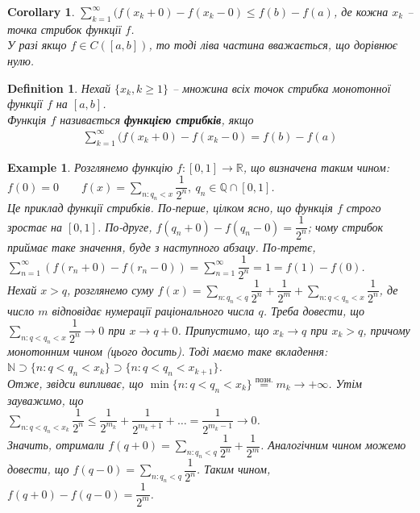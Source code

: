 \documentclass[a4paper, 10pt]{article}
\theoremstyle{theoremdd}
\theoremstyle{theoremdd}
\theoremstyle{theoremdd}
\newtheorem{definition}[theorem]{Definition}
\theoremstyle{theoremdd}
\theoremstyle{theoremdd}
\newtheorem{example}[theorem]{Example}
\theoremstyle{theoremdd}
\theoremstyle{theoremdd}
\theoremstyle{theoremdd}
\theoremstyle{theoremdd}
\newtheorem{corollary}[theorem]{Corollary}
\begin{document}
\begin{corollary}
\label{sum_of_all_jumps_estimation}
$\displaystyle\sum_{k=1}^\infty (f(x_k+0) - f(x_k-0) \leq f(b) - f(a)$, де кожна $x_k$ -- точка стрибок функції $f$.\\
\textit{У разі якщо $f \in C([a,b])$, то тоді ліва частина вважається, що дорівнює нулю.}
\end{corollary}

\begin{definition}
Нехай $\{x_k,k \geq 1\}$ -- множина всіх точок стрибка монотонної функції $f$ на $[a,b]$.\\
Функція $f$ називається \textbf{функцією стрибків}, якщо
\begin{align*}
\sum_{k=1}^\infty (f(x_k+0) - f(x_k-0) = f(b) - f(a)
\end{align*}
\end{definition}

\begin{example}
Розглянемо функцію $f \colon [0,1] \to \mathbb{R}$, що визначена таким чином:\\
$f(0) = 0 \qquad f(x) = \displaystyle\sum_{n : q_n < x} \dfrac{1}{2^n},\ q_n \in \mathbb{Q} \cap [0,1]$.\\
Це приклад функції стрибків. По-перше, цілком ясно, що функція $f$ строго зростає на $[0,1]$. По-друге, $f(q_n+0) - f(q_n-0) = \dfrac{1}{2^n}$; чому стрибок приймає таке значення, буде з наступного абзацу. По-третє, $\displaystyle\sum_{n=1}^\infty (f(r_n+0) - f(r_n-0)) = \sum_{n=1}^\infty \dfrac{1}{2^n} = 1 = f(1)-f(0)$.\\
Нехай $x > q$, розглянемо суму $f(x) = \displaystyle\sum_{n: q_n < q} \dfrac{1}{2^n} + \dfrac{1}{2^m}+ \sum_{n: q < q_n < x} \dfrac{1}{2^n}$, де число $m$ відповідає нумерації раціонального числа $q$. Треба довести, що $\displaystyle\sum_{n: q < q_n < x} \dfrac{1}{2^n} \to 0$ при $x \to q+0$. Припустимо, що $x_k \to q$ при $x_k > q$, причому монотонним чином (цього досить). Тоді маємо таке вкладення:\\
$\mathbb{N} \supset \{n: q < q_n < x_k\} \supset \{n: q < q_n < x_{k+1}\}$.\\
Отже, звідси випливає, що $\displaystyle\min \{n: q < q_n < x_k\} \overset{\text{позн.}}{=} m_k \to +\infty$. Утім зауважимо, що\\
$\displaystyle\sum_{n : q < q_n < x_k} \dfrac{1}{2^n} \leq \dfrac{1}{2^{m_k}} + \dfrac{1}{2^{m_k+1}} + \dots = \dfrac{1}{2^{m_k-1}} \to 0$.\\
Значить, отримали $f(q+0) = \displaystyle\sum_{n: q_n < q} \dfrac{1}{2^n} + \dfrac{1}{2^m}$. Аналогічним чином можемо довести, що $f(q-0) = \displaystyle\sum_{n: q_n < q} \dfrac{1}{2^n}$. Таким чином, $f(q+0) - f(q-0) = \dfrac{1}{2^m}$.
\end{example}
\end{document}
